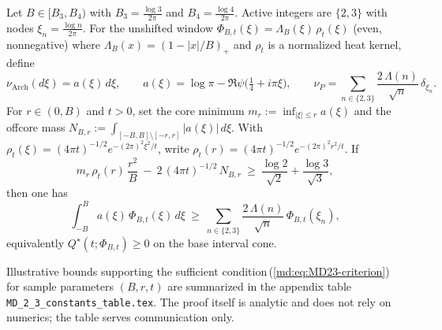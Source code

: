\begin{theorem}[MD$_{2,3}$: Base interval $[B_3,B_4)$]\label{md:thm:MD23}
Let $B\in[B_3,B_4)$ with $B_3=\tfrac{\log 3}{2\pi}$ and $B_4=\tfrac{\log 4}{2\pi}$. Active integers are $\{2,3\}$ with nodes $\xi_n=\tfrac{\log n}{2\pi}$. For the unshifted window $\Phi_{B,t}(\xi)=\Lambda_B(\xi)\,\rho_t(\xi)$ (even, nonnegative) where $\Lambda_B(x)=(1-|x|/B)_+$ and $\rho_t$ is a normalized heat kernel, define
\begin{equation}\label{eq:MD_2_3_base_interval-formula-2}
\nu_{\mathrm{Arch}}(d\xi)=a(\xi)\,d\xi,\qquad a(\xi)=\log\pi-\Re\psi\Big(\tfrac14+i\pi\xi\Big),\qquad \nu_P=\sum_{n\in\{2,3\}} \frac{2\,\Lambda(n)}{\sqrt n}\,\delta_{\xi_n}.
\end{equation}
For $r\in(0,B)$ and $t>0$, set the core minimum $m_r:=\inf_{|\xi|\le r} a(\xi)$ and the off\-core mass $N_{B,r}:=\int_{[-B,B]\setminus[-r,r]} |a(\xi)|\,d\xi$. With $\rho_t(\xi)=(4\pi t)^{-1/2} e^{-(2\pi)^2\xi^2/t}$, write $\rho_t(r)=(4\pi t)^{-1/2} e^{-(2\pi)^2 r^2/t}$. If
\begin{equation}\label{md:eq:MD23-criterion}
 m_r\,\rho_t(r)\,\frac{r^2}{B}\ -\ 2\,(4\pi t)^{-1/2}\,N_{B,r}\ \ge\ \frac{\log 2}{\sqrt 2}+\frac{\log 3}{\sqrt 3},
\end{equation}
then one has
\begin{equation}\label{eq:MD_2_3_base_interval-formula-11}
 \int_{-B}^{B} a(\xi)\,\Phi_{B,t}(\xi)\,d\xi\ \ge\ \sum_{n\in\{2,3\}} \frac{2\,\Lambda(n)}{\sqrt n}\,\Phi_{B,t}(\xi_n),
\end{equation}
equivalently $Q^\star(t;\Phi_{B,t})\ge 0$ on the base interval cone.
\end{theorem}
\begin{remark}
Illustrative bounds supporting the sufficient condition\,(\ref{md:eq:MD23-criterion}) for sample parameters $(B,r,t)$ are summarized in the appendix table \texttt{MD\_2\_3\_constants\_table.tex}. The proof itself is analytic and does not rely on numerics; the table serves communication only.
\end{remark}

